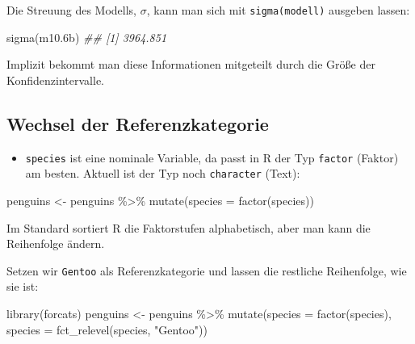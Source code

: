 \documentclass[
  a4paper,
  DIV=11]{scrreprt}
\newenvironment{Shaded}{\begin{snugshade}}{\end{snugshade}}
\newcommand{\AttributeTok}[1]{\textcolor[rgb]{0.40,0.45,0.13}{#1}}
\newcommand{\DocumentationTok}[1]{\textcolor[rgb]{0.37,0.37,0.37}{\textit{#1}}}
\newcommand{\FloatTok}[1]{\textcolor[rgb]{0.68,0.00,0.00}{#1}}
\newcommand{\FunctionTok}[1]{\textcolor[rgb]{0.28,0.35,0.67}{#1}}
\newcommand{\NormalTok}[1]{\textcolor[rgb]{0.00,0.23,0.31}{#1}}
\newcommand{\OtherTok}[1]{\textcolor[rgb]{0.00,0.23,0.31}{#1}}
\newcommand{\SpecialCharTok}[1]{\textcolor[rgb]{0.37,0.37,0.37}{#1}}
\newcommand{\StringTok}[1]{\textcolor[rgb]{0.13,0.47,0.30}{#1}}
\providecommand{\tightlist}{%
  \setlength{\itemsep}{0pt}\setlength{\parskip}{0pt}}\usepackage{longtable,booktabs,array}
\theoremstyle{definition}
\theoremstyle{remark}
\begin{document}
Die Streuung des Modells, \(\sigma\), kann man sich mit
\texttt{sigma(modell)} ausgeben lassen:

\begin{Shaded}
\begin{Highlighting}[]
\FunctionTok{sigma}\NormalTok{(m10}\FloatTok{.6}\NormalTok{b)}
\DocumentationTok{\#\# [1] 3964.851}
\end{Highlighting}
\end{Shaded}

Implizit bekommt man diese Informationen mitgeteilt durch die Größe der
Konfidenzintervalle.

\hypertarget{wechsel-der-referenzkategorie}{%
\subsection{Wechsel der
Referenzkategorie}\label{wechsel-der-referenzkategorie}}

\begin{itemize}
\tightlist
\item
  \texttt{species} ist eine nominale Variable, da passt in R der Typ
  \texttt{factor} (Faktor) am besten. Aktuell ist der Typ noch
  \texttt{character} (Text):
\end{itemize}

\begin{Shaded}
\begin{Highlighting}[]
\NormalTok{penguins }\OtherTok{\textless{}{-}}\NormalTok{ penguins }\SpecialCharTok{\%\textgreater{}\%} 
  \FunctionTok{mutate}\NormalTok{(}\AttributeTok{species =} \FunctionTok{factor}\NormalTok{(species))}
\end{Highlighting}
\end{Shaded}

Im Standard sortiert R die Faktorstufen alphabetisch, aber man kann die
Reihenfolge ändern.

\begin{Shaded}
\end{Shaded}

Setzen wir \texttt{Gentoo} als Referenzkategorie und lassen die
restliche Reihenfolge, wie sie ist:

\begin{Shaded}
\begin{Highlighting}[]
\FunctionTok{library}\NormalTok{(forcats)}
\NormalTok{penguins }\OtherTok{\textless{}{-}}\NormalTok{ penguins }\SpecialCharTok{\%\textgreater{}\%} 
  \FunctionTok{mutate}\NormalTok{(}\AttributeTok{species =} \FunctionTok{factor}\NormalTok{(species),}
    \AttributeTok{species =} \FunctionTok{fct\_relevel}\NormalTok{(species, }\StringTok{"Gentoo"}\NormalTok{))}
\end{Highlighting}
\end{Shaded}
\end{document}
